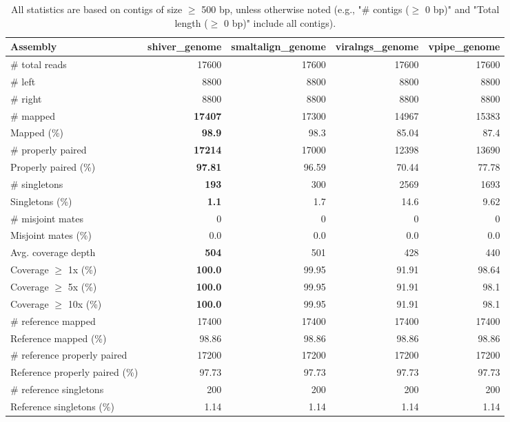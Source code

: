 \documentclass[12pt,a4paper]{article}
\begin{document}
\begin{table}[ht]
\begin{center}
\caption{All statistics are based on contigs of size $\geq$ 500 bp, unless otherwise noted (e.g., "\# contigs ($\geq$ 0 bp)" and "Total length ($\geq$ 0 bp)" include all contigs).}
\begin{tabular}{|l*{4}{|r}|}
\hline
Assembly & shiver\_genome & smaltalign\_genome & viralngs\_genome & vpipe\_genome \\ \hline
\# total reads & 17600 & 17600 & 17600 & 17600 \\ \hline
\# left & 8800 & 8800 & 8800 & 8800 \\ \hline
\# right & 8800 & 8800 & 8800 & 8800 \\ \hline
\# mapped & {\bf 17407} & 17300 & 14967 & 15383 \\ \hline
Mapped (\%) & {\bf 98.9} & 98.3 & 85.04 & 87.4 \\ \hline
\# properly paired & {\bf 17214} & 17000 & 12398 & 13690 \\ \hline
Properly paired (\%) & {\bf 97.81} & 96.59 & 70.44 & 77.78 \\ \hline
\# singletons & {\bf 193} & 300 & 2569 & 1693 \\ \hline
Singletons (\%) & {\bf 1.1} & 1.7 & 14.6 & 9.62 \\ \hline
\# misjoint mates & 0 & 0 & 0 & 0 \\ \hline
Misjoint mates (\%) & 0.0 & 0.0 & 0.0 & 0.0 \\ \hline
Avg. coverage depth & {\bf 504} & 501 & 428 & 440 \\ \hline
Coverage $\geq$ 1x (\%) & {\bf 100.0} & 99.95 & 91.91 & 98.64 \\ \hline
Coverage $\geq$ 5x (\%) & {\bf 100.0} & 99.95 & 91.91 & 98.1 \\ \hline
Coverage $\geq$ 10x (\%) & {\bf 100.0} & 99.95 & 91.91 & 98.1 \\ \hline
\# reference mapped & 17400 & 17400 & 17400 & 17400 \\ \hline
Reference mapped (\%) & 98.86 & 98.86 & 98.86 & 98.86 \\ \hline
\# reference properly paired & 17200 & 17200 & 17200 & 17200 \\ \hline
Reference properly paired (\%) & 97.73 & 97.73 & 97.73 & 97.73 \\ \hline
\# reference singletons & 200 & 200 & 200 & 200 \\ \hline
Reference singletons (\%) & 1.14 & 1.14 & 1.14 & 1.14 \\ \hline

\end{tabular}
\end{center}
\end{table}
\end{document}
